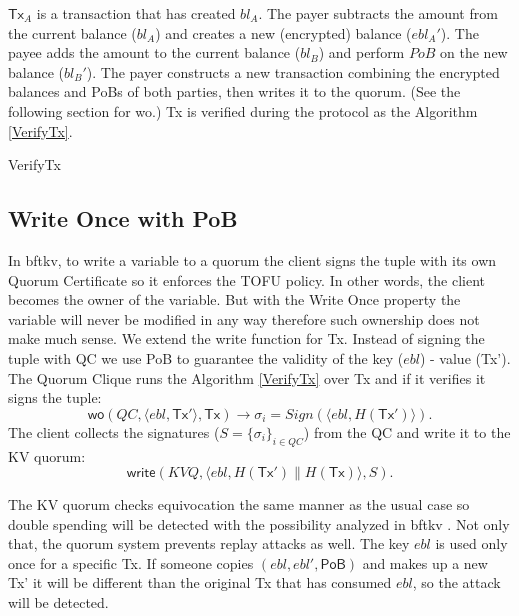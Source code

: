 \documentclass[10pt,fleqn]{article}
\begin{document}
$\textsf{Tx}_A$ is a transaction that has created $bl_A$. The payer subtracts the amount from the current balance ($bl_A$) and creates a new (encrypted) balance ($ebl_A'$). The payee adds the amount to the current balance ($bl_B$) and perform $PoB$ on the new balance ($bl_B'$). The payer constructs a new transaction combining the encrypted balances and PoBs of both parties, then writes it to the quorum. (See the following section for {\sf wo}.) \textsf{Tx} is verified during the protocol as the Algorithm \ref{VerifyTx}.
\begin{algorithm}[h]
\label{VerifyTx}
\caption{VerifyTx}
 {
   {
     {
    }
     {
    }
  }
}
\end{algorithm}

\subsection{Write Once with PoB}
In {\sf bftkv}, to write a variable to a quorum the client signs the tuple with its own Quorum Certificate so it enforces the TOFU policy. In other words, the client becomes the owner of the variable. But with the Write Once property the variable will never be modified in any way therefore such ownership does not make much sense. We extend the write function for \textsf{Tx}. Instead of signing the tuple with QC we use PoB to guarantee the validity of the key ($ebl$) - value (\textsf{Tx'}). The Quorum Clique runs the Algorithm \ref{VerifyTx} over \textsf{Tx} and if it verifies it signs the tuple:
\[
\textsf{wo}(QC, \langle ebl, \textsf{Tx}' \rangle, \textsf{Tx}) \longrightarrow \sigma_i = \textit{Sign}(\langle ebl, H(\textsf{Tx}') \rangle).
\]
The client collects the signatures ($S = \{\sigma_i\}_{i \in QC}$) from the QC and write it to the KV quorum:
\[
\textsf{write}(KVQ, \langle ebl, H(\textsf{Tx}') \parallel H(\textsf{Tx}) \rangle, S).
\]

The KV quorum checks equivocation the same manner as the usual case so double spending will be detected with the possibility analyzed in \textsf{bftkv} \cite{bftkv}. Not only that, the quorum system prevents replay attacks as well. The key $ebl$ is used only once for a specific \textsf{Tx}. If someone copies $(ebl, ebl', \textsf{PoB})$ and makes up a new \textsf{Tx'} it will be different than the original \textsf{Tx} that has consumed $ebl$, so the attack will be detected.
\end{document}
